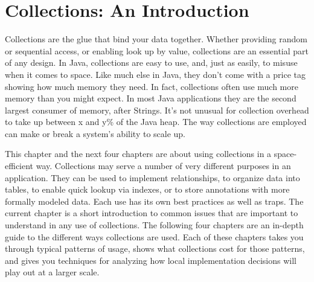 \chapter{Collections: An Introduction}
\label{chapter:brief-introduction-collections}

Collections are the glue that bind your data together.  Whether 
providing random or sequential access, or enabling
look up by value, collections are an essential part of any
design. In Java, collections are easy to use, and, just as easily, to misuse when
it comes to space. Like much else in Java, they don't come with a price tag
showing how much memory they need. In fact, collections
often use much more memory than you might expect. In most Java applications they are the second largest consumer of memory, after
Strings. It's not unusual for collection overhead to take up between x and y\%
of the Java heap. The way collections are employed can make
or break a system's ability to scale up.


This chapter and the next four chapters are about using
collections in a space-efficient way.  Collections may serve a number of very
different purposes in an application. They can be used to implement
relationships, to organize data into tables, to enable quick lookup via indexes, or
to store annotations with more formally modeled data. Each use
has its own best practices as well as traps. The current chapter
is a short introduction to common issues that are important to understand in
any use of collections. The following four chapters are an in-depth guide to 
the different ways collections are used. Each of these chapters takes
you through typical patterns of usage, shows what collections cost for those
patterns, and gives you techniques for analyzing how local implementation
decisions will play out at a larger scale. 

%

